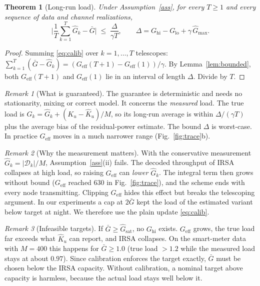 \documentclass[10pt]{article}
\newtheorem{theorem}{Theorem}
\theoremstyle{remark}
\newtheorem{remark}{Remark}
\theoremstyle{definition}
\newcommand{\Gb}{\bar G}
\newcommand{\Ge}{G_{\mathrm{eff}}}
\newcommand{\Gm}{\hat G}
\newcommand{\Kh}{\hat K_u}
\newcommand{\Dset}{\mathcal D}
\begin{document}
\begin{theorem}[Long-run load]
  \label{thm}
  Under Assumption~\ref{ass}, for every $T\ge1$ and every sequence of data and channel
  realizations,
  \[
    \Big|\frac1T\sum_{k=1}^T\Gm_k-\Gb\Big|
    \;\le\; \frac{\Delta}{\gamma T},
    \qquad \Delta = G_{\mathrm{hi}}-G_{\mathrm{lo}}+\gamma\,\Gm_{\max}.
  \]
\end{theorem}
\begin{proof}
  Summing \eqref{eq:calib} over $k=1,\dots,T$ telescopes:
  $\sum_{k=1}^T(\Gb-\Gm_k) = (\Ge(T+1)-\Ge(1))/\gamma$. By Lemma~\ref{lem:bounded}, both
  $\Ge(T+1)$ and $\Ge(1)$ lie in an interval of length $\Delta$. Divide by $T$.
\end{proof}

\begin{remark}[What is guaranteed]
  The guarantee is deterministic and needs no stationarity, mixing or correct model.
  It concerns the \emph{measured} load. The true load is
  $G_k=\Gm_k+(K_u-\Kh)/M$, so its long-run average is within $\Delta/(\gamma T)$ plus the
  average bias of the residual-power estimate. The bound $\Delta$ is worst-case. In practice
  $\Ge$ moves in a much narrower range (Fig.~\ref{fig:trace}b).
\end{remark}

\begin{remark}[Why the measurement matters]
  With the conservative measurement $\Gm_k=|\Dset_k|/M$, Assumption~\ref{ass}(ii) fails.
  The decoded throughput of IRSA collapses at high load, so raising $\Ge$ can
  \emph{lower} $\Gm_k$. The integral term then grows without bound ($\Ge$ reached
  630 in Fig.~\ref{fig:trace}), and the scheme ends with every node transmitting. Clipping
  $\Ge$ hides this effect but breaks the telescoping argument. In our experiments a cap at $2\Gb$
  kept the load of the estimated variant below target at night. We therefore use the plain
  update \eqref{eq:calib}.
\end{remark}

\begin{remark}[Infeasible targets]
  If $\Gb\ge\Gm_{\mathrm{sat}}$, no $G_{\mathrm{hi}}$ exists. $\Ge$ grows, the true load
  far exceeds what $\Kh$ can report, and IRSA collapses. On the smart-meter data with $M=400$ this
  happens for $\Gb\ge1.0$ (true load $>1.2$ while the measured load stays at about $0.97$). Since calibration
  enforces the target exactly, $\Gb$ must be chosen below the IRSA capacity. Without
  calibration, a nominal target above capacity is harmless, because the actual load stays well below it.
\end{remark}
\end{document}
